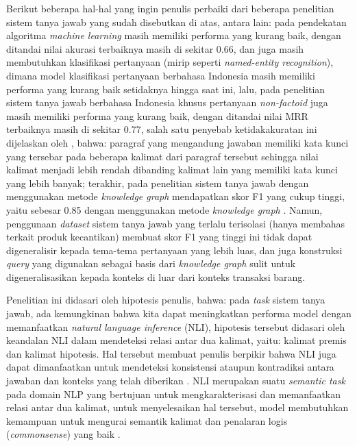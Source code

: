 Berikut beberapa hal-hal yang ingin penulis perbaiki dari beberapa penelitian sistem tanya jawab yang sudah disebutkan di atas, antara lain: pada pendekatan algoritma \emph{machine learning} \citep{machine-learning-approach} masih memiliki performa yang kurang baik, dengan ditandai nilai akurasi terbaiknya masih di sekitar 0.66, dan juga masih membutuhkan klasifikasi pertanyaan (mirip seperti \emph{named-entity recognition}), dimana model klasifikasi pertanyaan berbahasa Indonesia masih memiliki performa yang kurang baik setidaknya hingga saat ini, lalu, pada penelitian sistem tanya jawab berbahasa Indonesia khusus pertanyaan \emph{non-factoid} \citep{Purwarianti_Yusliani_2012} juga masih memiliki performa yang kurang baik, dengan ditandai nilai MRR terbaiknya masih di sekitar 0.77, salah satu penyebab ketidakakuratan ini dijelaskan oleh \citeauthor{Purwarianti_Yusliani_2012}, bahwa: paragraf yang mengandung jawaban memiliki kata kunci yang tersebar pada beberapa kalimat dari paragraf tersebut sehingga nilai kalimat menjadi lebih rendah dibanding kalimat lain yang memiliki kata kunci yang lebih banyak; terakhir, pada penelitian sistem tanya jawab dengan menggunakan metode \emph{knowledge graph} \citep{JLK} mendapatkan skor F1 yang cukup tinggi, yaitu sebesar 0.85 dengan menggunakan metode \emph{knowledge graph} \citep{JLK}. Namun, penggunaan \emph{dataset} sistem tanya jawab yang terlalu terisolasi (hanya membahas terkait produk kecantikan) membuat skor F1 yang tinggi ini tidak dapat digeneralisir kepada tema-tema pertanyaan yang lebih luas, dan juga konstruksi \emph{query} yang digunakan sebagai basis dari \emph{knowledge graph} sulit untuk digeneralisasikan kepada konteks di luar dari konteks transaksi barang.

Penelitian ini didasari oleh hipotesis penulis, bahwa: pada \emph{task} sistem tanya jawab, ada kemungkinan bahwa kita dapat meningkatkan performa model dengan memanfaatkan \emph{natural language inference} (NLI), hipotesis tersebut didasari oleh keandalan NLI dalam mendeteksi relasi antar dua kalimat, yaitu: kalimat premis dan kalimat hipotesis. Hal tersebut membuat penulis berpikir bahwa NLI juga dapat dimanfaatkan untuk mendeteksi konsistensi ataupun kontradiksi antara jawaban dan konteks yang telah diberikan \citep{bowman-etal-2015-large, maccartney-manning-2009-extended, giampiccolo-etal-2007-third}. NLI merupakan suatu \emph{semantic task} pada domain NLP yang bertujuan untuk mengkarakterisasi dan memanfaatkan relasi antar dua kalimat, untuk menyelesaikan hal tersebut, model membutuhkan kemampuan untuk mengurai semantik kalimat dan penalaran logis (\emph{commonsense}) yang baik \citep{bowman-etal-2015-large}.

